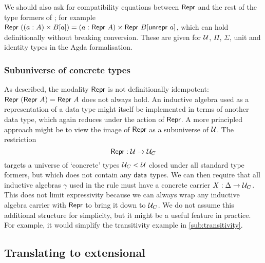 We should also ask for compatibility equations between $\textsf{Repr}$ and the rest of
the type formers of \lambdamltt; for example $\textsf{Repr}\ ((a : A) \times B[a]) = (a
: \textsf{Repr}\ A) \times \textsf{Repr}\ B[\textsf{unrepr}\ a]$, which can hold definitionally
without breaking conversion. These are given for $\mathcal{U}$, $\Pi$, $\Sigma$, unit
and identity types in the Agda formalisation.


\subsubsection{Subuniverse of concrete types}

As described, the modality $\textsf{Repr}$ is not definitionally idempotent: $\textsf{Repr}\
(\textsf{Repr}\ A) = \textsf{Repr}\ A$ does not always hold. An inductive algebra used as a
representation of a data type might itself be implemented in terms of another
data type, which again reduces under the action of $\textsf{Repr}$. A more principled
approach might be to view the image of $\textsf{Repr}$ as a subuniverse of $\mathcal{U}$. The
restriction
$$
\textsf{Repr} : \mathcal{U} \to \mathcal{U}_C
$$
targets a universe of `concrete' types $\mathcal{U}_C < \mathcal{U}$ closed under all
standard type formers, but which does not contain any $\textsf{data}$ types. We can
then require that all inductive algebras $\gamma$ used in the rule
\axiom{Data-Form} must have a concrete carrier $X : \Delta \to \mathcal{U}_C$. This
does not limit expressivity because we can always wrap any inductive algebra
carrier with $\textsf{Repr}$ to bring it down to $\mathcal{U}_C$. We do not assume this
additional structure for simplicity, but it might be a useful feature in
practice. For example, it would simplify the transitivity example in
\cref{sub:transitivity}.

\subsection{Translating to extensional \langmltt} \label{sub:translation}

